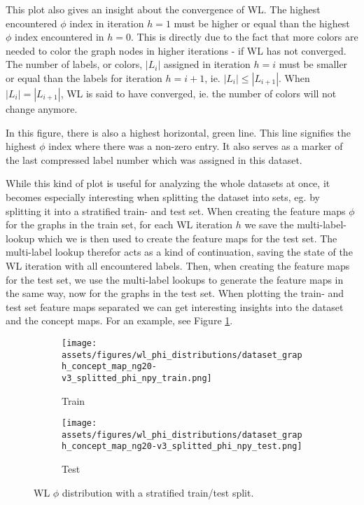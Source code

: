 This plot also gives an insight about the convergence of WL.
The highest encountered $\phi$ index in iteration $h=1$ must be higher or equal than the highest $\phi$ index encountered in $h=0$.
This is directly due to the fact that more colors are needed to color the graph nodes in higher iterations - if WL has not converged.
The number of labels, or colors, $|L_i|$ assigned in iteration $h=i$ must be smaller or equal than the labels for iteration $h=i+1$, ie. $|L_i| \leq |L_{i + 1}|$.
When $|L_i| = |L_{i + 1}|$, WL is said to have converged, ie. the number of colors will not change anymore.

In this figure, there is also a highest horizontal, green line.
This line signifies the highest $\phi$ index where there was a non-zero entry.
It also serves as a marker of the last compressed label number which was assigned in this dataset.

While this kind of plot is useful for analyzing the whole datasets at once, it becomes especially interesting when splitting the dataset into sets, eg. by splitting it into a stratified train- and test set.
When creating the feature maps $\phi$ for the graphs in the train set, for each WL iteration $h$ we save the multi-label-lookup which we is then used to create the feature maps for the test set.
The multi-label lookup therefor acts as a kind of continuation, saving the state of the WL iteration with all encountered labels.
Then, when creating the feature maps for the test set, we use the multi-label lookups to generate the feature maps in the same way, now for the graphs in the test set.
When plotting the train- and test set feature maps separated we can get interesting insights into the dataset and the concept maps.
For an example, see Figure \ref{fig:phi_distribution_train_test}.

\begin{figure}[htb!]
	\begin{subfigure}[t]{.49\linewidth}%
		{\texttt{[image: assets/figures/wl\_phi\_distributions/dataset\_graph\_concept\_map\_ng20-v3\_splitted\_phi\_npy\_train.png]}}\caption{Train}%
	\end{subfigure}%
	\begin{subfigure}[t]{.49\linewidth}%
		{\texttt{[image: assets/figures/wl\_phi\_distributions/dataset\_graph\_concept\_map\_ng20-v3\_splitted\_phi\_npy\_test.png]}}\caption{Test}%
	\end{subfigure}%
	\caption[Diagram: $\phi$ distribution plot for \textit{ng20}.]{WL $\phi$ distribution with a stratified train/test split.}%
	\label{fig:phi_distribution_train_test}
\end{figure}

